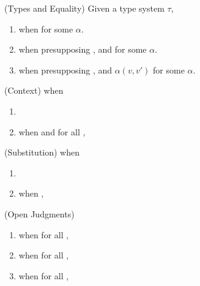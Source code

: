 

\begin{definition}(Types and Equality)
  Given a type system $\tau$, 
  \begin{enumerate}
    \item {} when  for some $\alpha$.
    \item {} when presupposing ,
       and  
      for some $\alpha$.
    \item {} when presupposing ,
       and $\alpha(v,v')$ for some $\alpha$.
  \end{enumerate}
\end{definition}

\begin{definition}(Context)
   when
  \begin{enumerate}
    \item \eqCtx{\cdot}{\cdot}
    \item {} when  and for all 
      , 
  \end{enumerate}
\end{definition}

\begin{definition}(Substitution)
   when
  \begin{enumerate}
    \item \eqInst{\cdot}{\cdot}{\cdot}
    \item {} when
      , 
  \end{enumerate}
\end{definition}

\begin{definition}(Open Judgments)
  \begin{enumerate}
    \item {} when for all , 
    \item {} when for all , 
    \item {} when for all , 
  \end{enumerate}
\end{definition}

